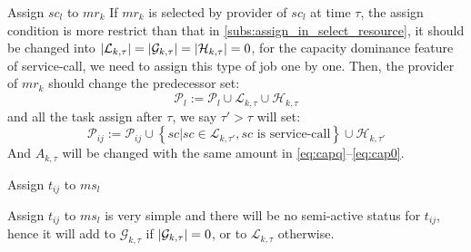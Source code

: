 \begin{asparaenum}
\item Assign $sc_l$ to $mr_k$
If $mr_k$ is selected by provider of $sc_l$ at time $\tau$, the assign condition is more restrict than that in \autoref{subs:assign_in_select_resource}, it should be changed into $\left|\mathcal{L}_{k,\tau}\right| = \left|\mathcal{G}_{k,\tau}\right| = \left|\mathcal{H}_{k,\tau}\right| = 0$, for the capacity dominance feature of service-call, we need to assign this type of job one by one. Then, the provider of $mr_k$ should change the predecessor set:
\begin{equation}
	\mathcal{P}_l := \mathcal{P}_l\cup \mathcal{L}_{k,\tau} \cup \mathcal{H}_{k,\tau}
\end{equation}
and all the task assign after $\tau$, we say $\tau'>\tau$ will set:
\begin{equation}
	\mathcal{P}_{ij} := \mathcal{P}_{ij}\cup \left\{ sc| sc\in\mathcal{L}_{k,\tau'},sc \text{ is service-call} \right\} \cup \mathcal{H}_{k,\tau'}
\end{equation}
And $A_{k,\tau}$ will be changed with the same amount in \autoref{eq:capq}--\ref{eq:cap0}.
\item Assign $t_{ij}$ to $ms_l$
\end{asparaenum}
Assign $t_{ij}$ to $ms_l$ is very simple and there will be no semi-active status for $t_{ij}$, hence it will add to $\mathcal{G}_{k,\tau}$ if $\left|\mathcal{G}_{k,\tau}\right|=0$, or to $\mathcal{L}_{k,\tau}$ otherwise.





